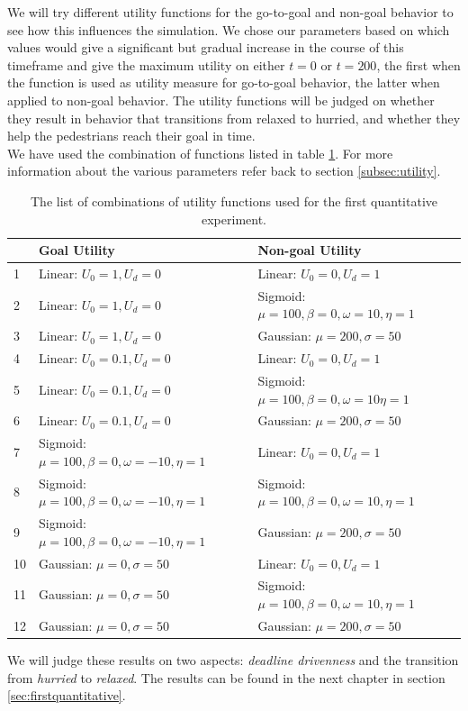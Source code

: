 \documentclass[11pt, a4paper]{book}
\begin{document}
We will try different utility functions for the go-to-goal and non-goal behavior to see how this influences the simulation. We chose our parameters based on which values would give a significant but gradual increase in the course of this timeframe and give the maximum utility on either $t=0$ or $t=200$, the first when the function is used as utility measure for go-to-goal behavior, the latter when applied to non-goal behavior. The utility functions will be judged on whether they result in behavior that transitions from relaxed to hurried, and whether they help the pedestrians reach their goal in time.\\
We have used the combination of functions listed in table \ref{tab:parameters}. For more information about the various parameters refer back to section \ref{subsec:utility}.
\begin{table}[h!]
\begin{tabular}{|l|l l|}
\hline
&\textbf{Goal Utility} & \textbf{Non-goal Utility}\\
\hline
1 & Linear: $U_0=1, U_d=0$ & Linear: $U_0=0, U_d=1$\\
\hline
2 & Linear: $U_0=1, U_d=0$ & Sigmoid: $\mu=100, \beta=0, \omega=10, \eta=1$\\
\hline
3 & Linear: $U_0=1, U_d=0$ & Gaussian: $\mu=200, \sigma=50$\\
\hline
4 & Linear: $U_0=0.1, U_d=0$ & Linear: $U_0=0, U_d=1$\\
\hline
5 & Linear: $U_0=0.1, U_d=0$ & Sigmoid: $\mu=100, \beta=0, \omega=10 \eta=1$\\
\hline
6 & Linear: $U_0=0.1, U_d=0$ & Gaussian: $\mu=200, \sigma=50$\\
\hline
7 & Sigmoid: $\mu=100, \beta=0, \omega=-10, \eta=1$ & Linear: $U_0=0, U_d=1$\\
\hline
8 & Sigmoid: $\mu=100, \beta=0, \omega=-10, \eta=1$ & Sigmoid: $\mu=100, \beta=0, \omega=10, \eta=1$\\
\hline
9 & Sigmoid: $\mu=100, \beta=0, \omega=-10, \eta=1$ & Gaussian: $\mu=200, \sigma=50$\\
\hline
10 & Gaussian: $\mu=0, \sigma=50$ & Linear: $U_0=0, U_d=1$\\
\hline
11 & Gaussian: $\mu=0, \sigma=50$ & Sigmoid: $\mu=100, \beta=0, \omega=10, \eta=1$\\
\hline
12 & Gaussian: $\mu=0, \sigma=50$ & Gaussian: $\mu=200, \sigma=50$\\
\hline
\end{tabular}
\caption{The list of combinations of utility functions used for the first quantitative experiment.}
\label{tab:parameters}
\end{table}
We will judge these results on two aspects: \emph{deadline drivenness} and the transition from \emph{hurried} to \emph{relaxed}.
The results can be found in the next chapter in section \ref{sec:firstquantitative}.
\end{document}

